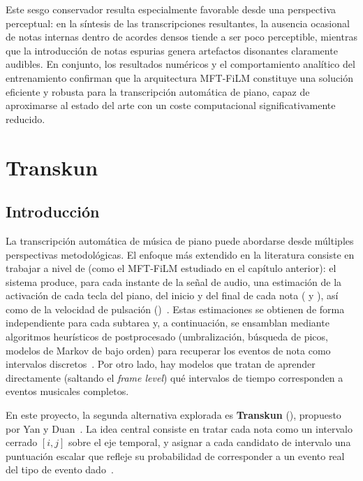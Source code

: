 \documentclass[11pt,spanish,listoffigures,listoftables]{tfgetsinf}
\begin{document}
Este sesgo conservador resulta especialmente favorable desde una perspectiva perceptual: en la síntesis de 
las transcripciones resultantes, la ausencia ocasional de notas internas dentro de acordes densos tiende a 
ser poco perceptible, mientras que la introducción de notas espurias genera artefactos disonantes claramente 
audibles. En conjunto, los resultados numéricos y el comportamiento analítico del entrenamiento confirman que
la arquitectura MFT-FiLM constituye una solución eficiente y robusta para la transcripción automática de piano, 
capaz de aproximarse al estado del arte con un coste computacional significativamente reducido.

\chapter{Transkun}
\label{chap:transkun}

\section{Introducción}

La transcripción automática de música de piano puede abordarse desde múltiples perspectivas
metodológicas. El enfoque más extendido en la literatura consiste en trabajar a nivel de
 (como el MFT-FiLM estudiado en el
capítulo anterior): el sistema produce, para cada instante de la señal de audio, una
estimación de la activación de cada tecla del piano, del inicio y del final de cada nota
( y ), así como de la velocidad de pulsación
()~\cite{hawthorne2018onsetsframes,kong2021highres}. Estas
estimaciones se obtienen de forma independiente para cada subtarea y, a continuación, se
ensamblan mediante algoritmos heurísticos de postprocesado (umbralización, búsqueda de
picos, modelos de Markov de bajo orden) para recuperar los eventos de nota como intervalos
discretos~\cite{kwon2020polyphonic}. Por otro lado, hay modelos que tratan de aprender directamente (saltando el \textit{frame level})
qué intervalos de tiempo corresponden a eventos musicales completos.

En este proyecto, la segunda alternativa explorada es \textbf{Transkun}
(), propuesto por Yan y
Duan~\cite{yan2024transkun}. La idea central
consiste en tratar cada nota como un intervalo cerrado $[i, j]$ sobre el eje temporal,
y asignar a cada candidato de intervalo una puntuación escalar que refleje su probabilidad
de corresponder a un evento real del tipo de evento dado~\cite{yan2024transkun}.
\end{document}
